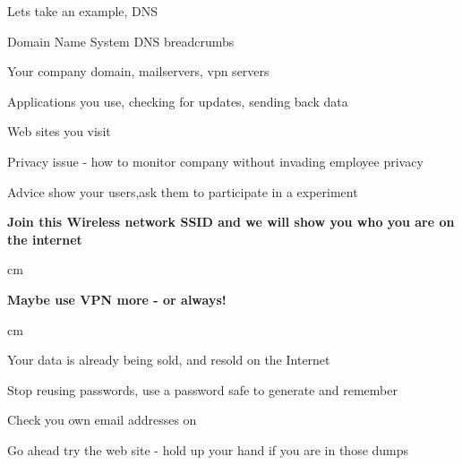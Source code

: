 \documentclass[Screen16to9,17pt,footrule]{foils}
\begin{document}

\begin{list1}
\item Lets take an example, DNS
\item Domain Name System DNS breadcrumbs
\begin{list2}
\item Your company domain, mailservers, vpn servers
\item Applications you use, checking for updates, sending back data
\item Web sites you visit
\item Privacy issue - how to monitor company without invading employee privacy
\end{list2}
\vskip 1cm
\item Advice show your users,ask them to participate in a experiment
\item {\bf Join this Wireless network SSID and we will show you who you are on the internet}
\end{list1}


 cm
\centerline{\bf\Large Maybe use VPN more - or always!}
 cm



\begin{list1}
\item Your data is already being sold, and resold on the Internet
\item Stop reusing passwords, use a password safe to generate and remember
\item Check you own email addresses on 
\end{list1}

\centerline{Go ahead try the web site - hold up your hand if you are in those dumps}



{~}
\end{document}
